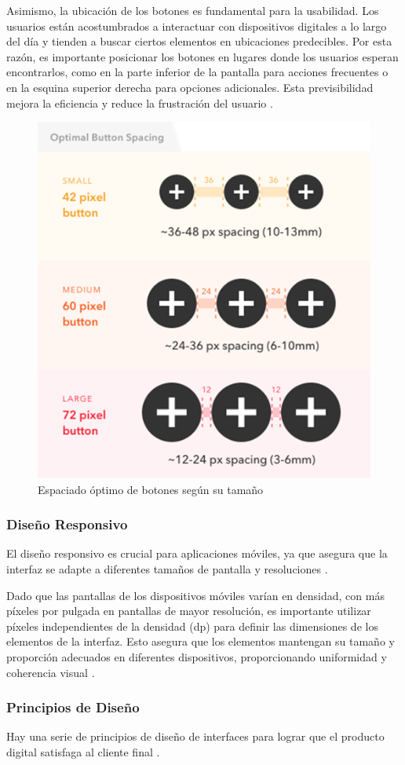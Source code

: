 Asimismo, la ubicación de los botones es fundamental para la usabilidad. Los usuarios están acostumbrados a interactuar con dispositivos digitales a lo largo del día y tienden a buscar ciertos elementos en ubicaciones predecibles. Por esta razón, es importante posicionar los botones en lugares donde los usuarios esperan encontrarlos, como en la parte inferior de la pantalla para acciones frecuentes o en la esquina superior derecha para opciones adicionales. Esta previsibilidad mejora la eficiencia y reduce la frustración del usuario \cite{Pickaso2022}.

\begin{figure} [h]
    \centering
    \includegraphics[width=0.5\linewidth]{figuras/optimal_space_buttons.png}
    \caption{Espaciado óptimo de botones según su tamaño}
    \label{fig:esapcio_optimo}
\end{figure}


\subsubsection{Diseño Responsivo}
El diseño responsivo es crucial para aplicaciones móviles, ya que asegura que la interfaz se adapte a diferentes tamaños de pantalla y resoluciones \cite{Becos2024}.

Dado que las pantallas de los dispositivos móviles varían en densidad, con más píxeles por pulgada en pantallas de mayor resolución, es importante utilizar píxeles independientes de la densidad (dp) para definir las dimensiones de los elementos de la interfaz. Esto asegura que los elementos mantengan su tamaño y proporción adecuados en diferentes dispositivos, proporcionando uniformidad y coherencia visual \cite{Pickaso2022}.

\subsubsection{Principios de Diseño}
Hay una serie de principios de diseño de interfaces para lograr que el producto digital satisfaga al cliente final \cite{AnonimoUX}.

